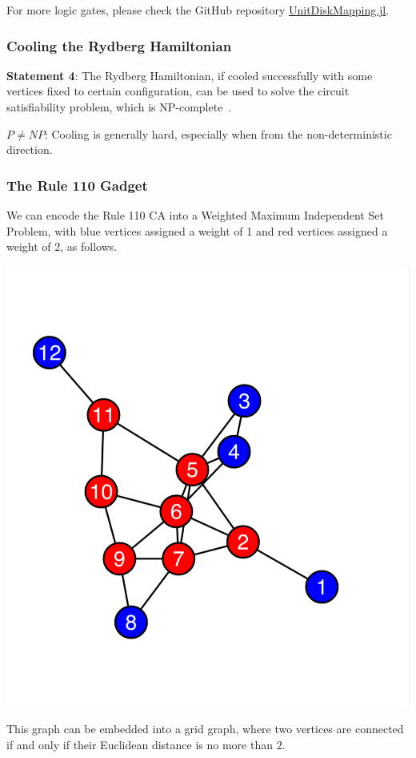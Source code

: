 \documentclass[twocolumn,superscriptaddress,english,showpacs,longbibliography]{revtex4-2}
\begin{document}
For more logic gates, please check the GitHub repository
\href{https://github.com/QuEraComputing/UnitDiskMapping.jl/blob/main/test/logicgates.jl}{UnitDiskMapping.jl}.

\subsubsection{Cooling the Rydberg Hamiltonian}\label{cooling-the-rydberg-hamiltonian}

\textbf{Statement 4}: The Rydberg Hamiltonian, if cooled successfully
with some vertices fixed to certain configuration, can be used to solve
the circuit satisfiability problem, which is NP-complete~\cite{Moore2011}.

$P \neq NP$: Cooling is generally hard, especially when from the
non-deterministic direction.

\subsubsection{The Rule 110 Gadget}\label{the-rule-110-gadget}

We can encode the Rule 110 CA into a Weighted Maximum
Independent Set Problem, with blue vertices assigned a weight of 1 and
red vertices assigned a weight of 2, as follows.

\includegraphics[width=0.6\columnwidth]{../notes/images/image.png}

This graph can be embedded into a grid graph, where two vertices are
connected if and only if their Euclidean distance is no more than $2$.
\end{document}
